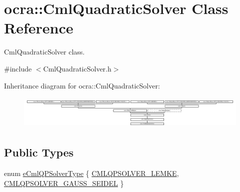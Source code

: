 \hypertarget{classocra_1_1CmlQuadraticSolver}{}\section{ocra\+:\+:Cml\+Quadratic\+Solver Class Reference}
\label{classocra_1_1CmlQuadraticSolver}


Cml\+Quadratic\+Solver class.  




{\ttfamily \#include $<$Cml\+Quadratic\+Solver.\+h$>$}

Inheritance diagram for ocra\+:\+:Cml\+Quadratic\+Solver\+:\begin{figure}[H]
\begin{center}
\leavevmode
\includegraphics[height=1.623188cm]{d4/d02/classocra_1_1CmlQuadraticSolver}
\end{center}
\end{figure}
\subsection*{Public Types}
\begin{DoxyCompactItemize}
\item 
enum \hyperlink{classocra_1_1CmlQuadraticSolver_a6d54dc2e4dac085099b002c88cb6d3df}{e\+Cml\+Q\+P\+Solver\+Type} \{ \hyperlink{classocra_1_1CmlQuadraticSolver_a6d54dc2e4dac085099b002c88cb6d3dfac7ab4857986d549d2c7ac2f4e7d834cc}{C\+M\+L\+Q\+P\+S\+O\+L\+V\+E\+R\+\_\+\+L\+E\+M\+KE}, 
\hyperlink{classocra_1_1CmlQuadraticSolver_a6d54dc2e4dac085099b002c88cb6d3dfa53afe853cc16e5023a4618d57cb082f1}{C\+M\+L\+Q\+P\+S\+O\+L\+V\+E\+R\+\_\+\+G\+A\+U\+S\+S\+\_\+\+S\+E\+I\+D\+EL}
 \}
\end{DoxyCompactItemize}
